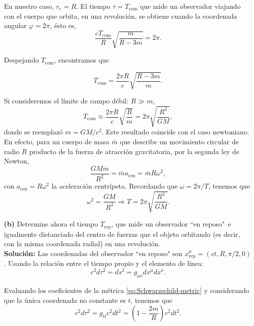 \documentclass[letterpaper,11pt]{article}
\begin{document}
En nuestro caso, $r_{\text{c}} = R$. El tiempo $\tau = T_{\text{com}}$ que mide un observador viajando con el cuerpo que orbita, en una revolución, se obtiene cuando la coordenada angular $\varphi = 2\pi$, ésto es,
\begin{equation}
\frac{cT_{\text{com}}}{R} \sqrt{\frac{m}{R - 3m}} = 2\pi.
\end{equation}

Despejando $T_{\text{com}}$, encontramos que
\begin{shaded}
\begin{equation}
T_{\text{com}} =  \frac{2\pi R}{c} \sqrt{\frac{R-3m}{m}}.  \label{eq:ej-2-a)}
\end{equation}
\end{shaded}

Si consideremos el límite de campo débil: $R \gg m$, 
\begin{equation}
T_{\text{com}} \approx  \frac{2\pi R}{c} \sqrt{\frac{R}{m}} = 2\pi \sqrt{\frac{R^3}{GM}}, 
\end{equation}
donde se reemplazó $m = GM/c^2$. Este resultado coincide con el caso newtoniano. En efecto, para un cuerpo de masa $\bar{m}$ que describe un movimiento circular de radio $R$ producto de la fuerza de atracción gravitatoria, por la segunda ley de Newton,
\begin{equation}
\frac{GM\bar{m}}{R^2} = \bar{m} a_{\text{cen}} = \bar{m} R \omega^2,
\end{equation}
con $a_{\text{cen}} = R\omega^2$ la aceleración centrípeta. Recordando que $\omega = 2\pi/T$, tenemos que
\begin{equation}
\omega^2 = \frac{GM}{R^3} \Rightarrow T = 2\pi \sqrt{\frac{R^3}{GM}}. \label{eq:period-newton}
\end{equation}

\textbf{(b)} Determine ahora el tiempo $T_{\text{rep}}$, que mide un observador ``en reposo"\ e igualmente distanciado del centro de fuerzas que el objeto orbitando (es decir, con la misma coordenada radial) en una revolución.
\\

\textbf{Solución:} Las coordenadas del observador ``en reposo" son $x_{\text{rep}}^{\mu} = (ct,R,\pi/2,0)$. Usando la relación entre el tiempo propio y el elemento de línea:
\begin{equation}
c^2d\tau^2 = ds^2 = g_{\mu\nu} dx^{\mu}dx^{\nu}.
\end{equation}

Evaluando los coeficientes de la métrica \eqref{eq:Schwarzschild-metric} y considerando que la única coordenada no constante es $t$, tenemos que 
\begin{equation}
c^2d\tau^2 = g_{tt} c^2 dt^2 = \left( 1 - \frac{2m}{R}\right) c^2dt^2.
\end{equation}
\end{document}
